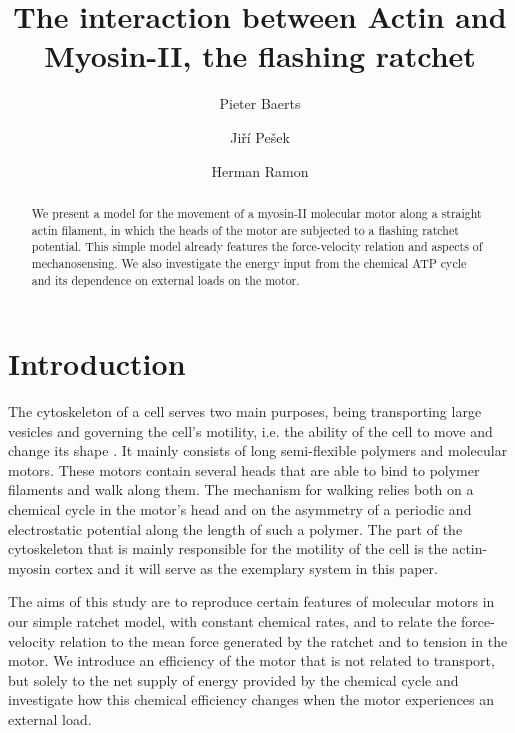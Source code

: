 \documentclass[aps,pre,twocolumn,showpacs,showkeys,superscriptaddress,floatfix]{revtex4-1}
\begin{document}
 

\title{The interaction between Actin and Myosin-II, the flashing ratchet}
\author{Pieter Baerts}
\author{Jiří Pešek}
\author{Herman Ramon}

\begin{abstract}
We present a model for the movement of a myosin-II molecular motor along a straight actin filament, in which the heads of the motor are subjected to a flashing ratchet potential. This simple model already features the force-velocity relation and aspects of mechanosensing. We also investigate the energy input from the chemical ATP cycle and its dependence on external loads on the motor.  
\end{abstract}

\maketitle 

\section{Introduction}

The cytoskeleton of a cell serves two main purposes, being transporting large vesicles and governing the cell's motility, i.e. the ability of the cell to move and change its shape \cite{ross2008cargo,mitchison1996actin}.
It mainly consists of long semi-flexible polymers and molecular motors. 
These motors contain several heads that are able to bind to polymer filaments and walk along them. 
The mechanism for walking relies both on a chemical cycle in the motor's head and on the asymmetry of a periodic and electrostatic potential along the length of such a polymer. The part of the cytoskeleton that is mainly responsible for the motility of the cell is the actin-myosin cortex \cite{vicente2009non} and it will serve as the exemplary system in this paper.

The aims of this study are to reproduce certain features of molecular motors in our simple ratchet model, with constant chemical rates, and to relate the force-velocity relation to the mean force generated by the ratchet and to tension in the motor.
We introduce an efficiency of the motor that is not related to transport, but solely to the net supply of energy provided by the chemical cycle 
and investigate how this chemical efficiency changes when the motor experiences an external load.
\end{document}
